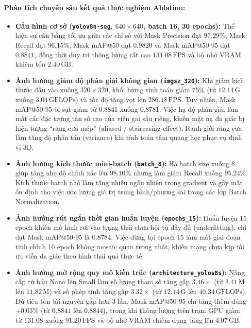 \documentclass[12pt,a4paper]{article}
\begin{document}
\paragraph{Phân tích chuyên sâu kết quả thực nghiệm Ablation:}
\begin{itemize}
    \item \textbf{Cấu hình cơ sở (\texttt{yolov8n-seg}, $640\times 640$, batch 16, 30 epochs):} Thể hiện sự cân bằng tối ưu giữa các chỉ số với Mask Precision đạt $97.29\%$, Mask Recall đạt $96.15\%$, Mask mAP@50 đạt $0.9820$ và Mask mAP@50-95 đạt $0.8841$, đồng thời duy trì thông lượng rất cao $131.08\,\text{FPS}$ và bộ nhớ VRAM khiêm tốn $2.40\,\text{GB}$.
    
    \item \textbf{Ảnh hưởng giảm độ phân giải không gian (\texttt{imgsz\_320}):} Khi giảm kích thước đầu vào xuống $320 \times 320$, khối lượng tính toán giảm $75\%$ (từ $12.14\,\text{G}$ xuống $3.04\,\text{GFLOPs}$) và tốc độ tăng vọt lên $286.18\,\text{FPS}$. Tuy nhiên, Mask mAP@50-95 bị sụt giảm từ $0.8841$ xuống $0.8781$. Việc hạ độ phân giải làm mất các đặc trưng tần số cao của viền gai sầu riêng, khiến mặt nạ đa giác bị hiện tượng ``răng cưa mép'' (aliased / staircasing effect). Ranh giới răng cưa làm tăng độ phân tán (variance) khi tính toán tâm quang học phục vụ định vị 3D.
    
    \item \textbf{Ảnh hưởng kích thước mini-batch (\texttt{batch\_8}):} Hạ batch size xuống 8 giúp tăng nhẹ độ chính xác lên $98.10\%$ nhưng làm giảm Recall xuống $95.24\%$. Kích thước batch nhỏ làm tăng nhiễu ngẫu nhiên trong gradient và gây mất ổn định cho việc ước lượng giá trị trung bình/phương sai trong các lớp Batch Normalization.
    
    \item \textbf{Ảnh hưởng rút ngắn thời gian huấn luyện (\texttt{epochs\_15}):} Huấn luyện 15 epoch khiến mô hình rơi vào trạng thái chưa hội tụ đầy đủ (underfitting), chỉ đạt Mask mAP@50-95 là $0.8784$. Việc dừng tại epoch 15 làm mất giai đoạn tinh chỉnh 10 epoch không mosaic quan trọng nhất, khiến mạng chưa kịp tối ưu viền đa giác theo hình thái quả thực tế.
    
    \item \textbf{Ảnh hưởng mở rộng quy mô kiến trúc (\texttt{architecture\_yolov8s}):} Nâng cấp từ bản Nano lên Small làm số lượng tham số tăng gấp $3.46\times$ (từ $3.41\,\text{M}$ lên $11.82\,\text{M}$) và số phép tính tăng gấp $3.32\times$ (từ $12.14\,\text{G}$ lên $40.34\,\text{GFLOPs}$). Dù tiêu tốn tài nguyên gấp hơn 3 lần, Mask mAP@50-95 chỉ tăng thêm đúng \textbf{$+0.03\%$} (từ $0.8841$ lên $0.8844$), trong khi thông lượng trên trạm GPU giảm từ $131.08$ xuống $91.20\,\text{FPS}$ và bộ nhớ VRAM chiếm dụng tăng lên $4.07\,\text{GB}$.
\end{itemize}
\end{document}
